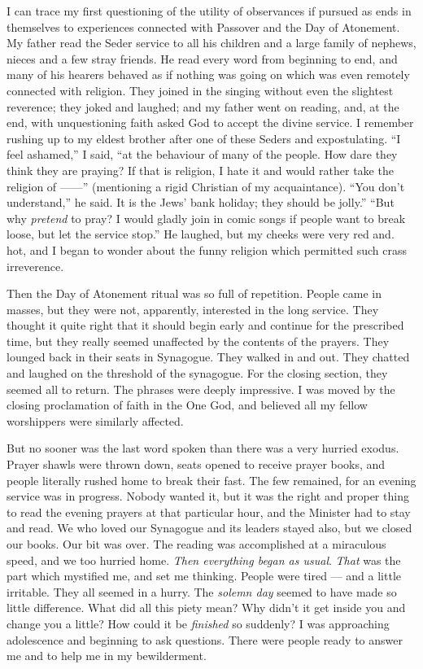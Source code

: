 I can trace my first questioning of the utility of
observances if pursued as ends in themselves to experiences
connected with Passover and the Day of Atonement.
My father read the Seder service to all his children and a
large family of nephews, nieces and a few stray friends.
He read every word from beginning to end, and many
of his hearers behaved as if nothing was going on which
was even remotely connected with religion. They
joined in the singing without even the slightest reverence;
they joked and laughed; and my father went on reading,
and, at the end, with unquestioning faith asked God to
accept the divine service. I remember rushing up to my
eldest brother after one of these Seders and expostulating.
“I feel ashamed,” I said, “at the behaviour of many
of the people. How dare they think they are praying?
If that is religion, I hate it and would rather take the
religion of ——” (mentioning a rigid Christian of my
acquaintance). “You don’t understand,” he said.
It is the Jews’ bank holiday; they should be jolly.”
“But why \textsl{pretend} to pray? I would gladly join in comic
songs if people want to break loose, but let the service
stop.” He laughed, but my cheeks were very red and.
hot, and I began to wonder about the funny religion
which permitted such crass irreverence.

Then the Day of Atonement ritual was so full of
repetition. People came in masses, but they were not,
apparently, interested in the long service. They thought
it quite right that it should begin early and continue for
the prescribed time, but they really seemed unaffected by
the contents of the prayers. They lounged back in their
seats in Synagogue. They walked in and out. They
chatted and laughed on the threshold of the synagogue.
For the closing section, they seemed all to return. The
phrases were deeply impressive. I was moved by the
closing proclamation of faith in the One God, and
believed all my fellow worshippers were similarly
affected.

But no sooner was the last word spoken than there
was a very hurried exodus. Prayer shawls were thrown
down, seats opened to receive prayer books, and people
literally rushed home to break their fast. The few
remained, for an evening service was in progress. Nobody
wanted it, but it was the right and proper thing to read
the evening prayers at that particular hour, and the
Minister had to stay and read. We who loved our
Synagogue and its leaders stayed also, but we closed our
books. Our bit was over. The reading was accomplished
at a miraculous speed, and we too hurried home. \textsl{Then
everything began as usual}. \textsl{That} was the part which
mystified me, and set me thinking. People were tired —
and a little irritable. They all seemed in a hurry. The
\textsl{solemn day} seemed to have made so little difference.
What did all this piety mean? Why didn’t it get inside
you and change you a little? How could it be \textsl{finished}
so suddenly? I was approaching adolescence and beginning
to ask questions. There were people ready to
answer me and to help me in my bewilderment.
